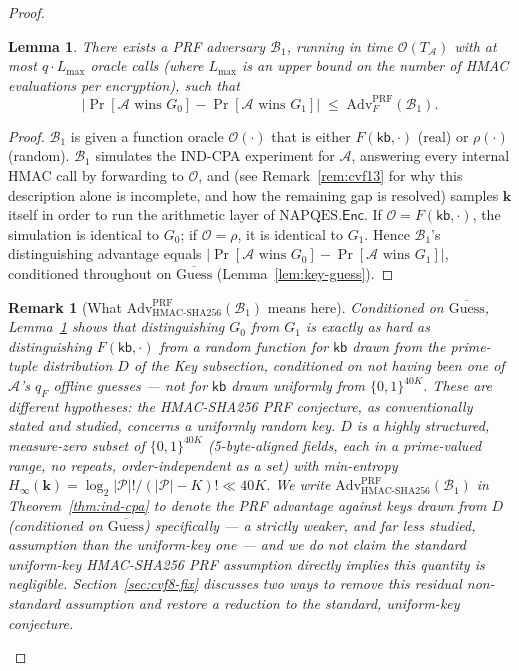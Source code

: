 \documentclass[11pt,a4paper]{article}
\newtheorem{lemma}[theorem]{Lemma}
\newtheorem{remark}[theorem]{Remark}
\begin{document}
\begin{proof}
\begin{lemma}\label{lem:prf-hop}
There exists a PRF adversary $\mathcal{B}_1$, running in time
$\mathcal{O}(T_{\mathcal{A}})$ with at most $q\cdot L_{\max}$ oracle calls
(where $L_{\max}$ is an upper bound on the number of HMAC evaluations per
encryption), such that
\[
  \bigl|\Pr[\mathcal{A}\text{ wins }G_0]-\Pr[\mathcal{A}\text{ wins }G_1]\bigr|
  \;\leq\;
  \mathrm{Adv}^{\mathrm{PRF}}_{F}(\mathcal{B}_1).
\]
\end{lemma}

\begin{proof}
$\mathcal{B}_1$ is given a function oracle $\mathcal{O}(\cdot)$ that is
either $F(\mathsf{kb},\cdot)$ (real) or $\rho(\cdot)$ (random).
$\mathcal{B}_1$ simulates the IND-CPA experiment for $\mathcal{A}$, answering
every internal HMAC call by forwarding to $\mathcal{O}$, and
(see Remark~\ref{rem:cvf13} for why this description alone is
incomplete, and how the remaining gap is resolved) samples $\mathbf{k}$
itself in order to run the arithmetic layer of $\mathrm{NAPQES}.\mathsf{Enc}$.
If $\mathcal{O}=F(\mathsf{kb},\cdot)$, the simulation is identical to $G_0$;
if $\mathcal{O}=\rho$, it is identical to $G_1$.
Hence $\mathcal{B}_1$'s distinguishing advantage equals
$|\Pr[\mathcal{A}\text{ wins }G_0]-\Pr[\mathcal{A}\text{ wins }G_1]|$,
conditioned throughout on $\overline{\mathrm{Guess}}$ (Lemma~\ref{lem:key-guess}).
\end{proof}

\begin{remark}[What $\mathrm{Adv}^{\mathrm{PRF}}_{\mathrm{HMAC\text{-}SHA256}}(\mathcal{B}_1)$ means here]
\label{rem:prf-d}
Conditioned on $\overline{\mathrm{Guess}}$, Lemma~\ref{lem:prf-hop} shows
that distinguishing $G_0$ from $G_1$ is exactly as hard as distinguishing
$F(\mathsf{kb},\cdot)$ from a random function \emph{for $\mathsf{kb}$ drawn
from the prime-tuple distribution $D$ of the Key subsection, conditioned on
not having been one of $\mathcal{A}$'s $q_F$ offline guesses} --- not for
$\mathsf{kb}$ drawn uniformly from $\{0,1\}^{40K}$. These are different
hypotheses: the HMAC-SHA256 PRF conjecture, as conventionally stated and
studied, concerns a uniformly random key. $D$ is a highly structured,
measure-zero subset of $\{0,1\}^{40K}$ (5-byte-aligned fields, each in a
prime-valued range, no repeats, order-independent as a set) with min-entropy
$H_\infty(\mathbf{k}) = \log_2|\mathcal{P}|!/(|\mathcal{P}|-K)! \ll 40K$.
We write $\mathrm{Adv}^{\mathrm{PRF}}_{\mathrm{HMAC\text{-}SHA256}}(\mathcal{B}_1)$
in Theorem~\ref{thm:ind-cpa} to denote the PRF advantage against keys drawn
from $D$ (conditioned on $\overline{\mathrm{Guess}}$) specifically --- a
strictly weaker, and far less studied, assumption than the uniform-key one
--- and we do not claim the standard uniform-key HMAC-SHA256 PRF assumption
directly implies this quantity is negligible. Section~\ref{sec:cvf8-fix}
discusses two ways to remove this residual non-standard assumption and
restore a reduction to the standard, uniform-key conjecture.
\end{remark}


\end{proof}
\end{document}
